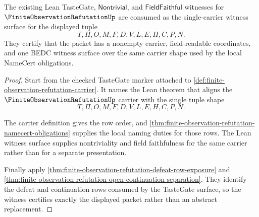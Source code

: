 \begin{theorem}
\label{thm:finite-observation-refutation-tastegate-witness-surface}
The existing Lean TasteGate, $\mathsf{Nontrivial}$, and $\mathsf{FieldFaithful}$ witnesses for $\FiniteObservationRefutationUp$ are consumed as the single-carrier witness surface for the displayed tuple
$$
T,\Pi,O,M,F,D,V,L,E,H,C,P,N.
$$
They certify that the packet has a nonempty carrier, field-readable coordinates, and one BEDC witness surface over the same carrier shape used by the local NameCert obligations.
\end{theorem}
\begin{proof}
Start from the checked TasteGate marker attached to \autoref{def:finite-observation-refutation-carrier}. It names the Lean theorem that aligns the $\FiniteObservationRefutationUp$ carrier with the single tuple shape
$$
T,\Pi,O,M,F,D,V,L,E,H,C,P,N.
$$

The carrier definition gives the row order, and \autoref{thm:finite-observation-refutation-namecert-obligations} supplies the local naming duties for those rows. The Lean witness surface supplies nontriviality and field faithfulness for the same carrier rather than for a separate presentation.

Finally apply \autoref{thm:finite-observation-refutation-defeat-row-exposure} and \autoref{thm:finite-observation-refutation-open-continuation-separation}. They identify the defeat and continuation rows consumed by the TasteGate surface, so the witness certifies exactly the displayed packet rather than an abstract replacement.
\end{proof}

